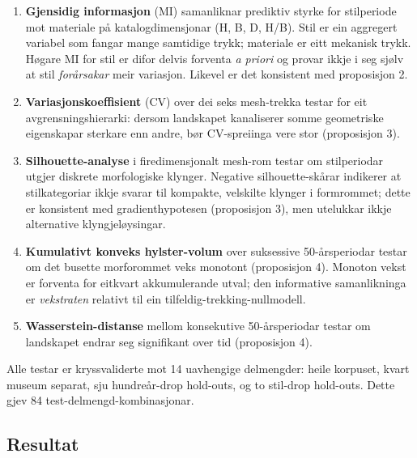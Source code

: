 \begin{enumerate}
\item \textbf{Gjensidig informasjon} (MI) samanliknar prediktiv styrke for stilperiode mot materiale på katalogdimensjonar (H, B, D, H/B). Stil er ein aggregert variabel som fangar mange samtidige trykk; materiale er eitt mekanisk trykk. Høgare MI for stil er difor delvis forventa \textit{a priori} og provar ikkje i seg sjølv at stil \textit{forårsakar} meir variasjon. Likevel er det konsistent med proposisjon 2.

\item \textbf{Variasjonskoeffisient} (CV) over dei seks mesh-trekka testar for eit avgrensningshierarki: dersom landskapet kanaliserer somme geometriske eigenskapar sterkare enn andre, bør CV-spreiinga vere stor (proposisjon 3).

\item \textbf{Silhouette-analyse} i firedimensjonalt mesh-rom testar om stilperiodar utgjer diskrete morfologiske klynger. Negative silhouette-skårar indikerer at stilkategoriar ikkje svarar til kompakte, velskilte klynger i formrommet; dette er konsistent med gradienthypotesen (proposisjon 3), men utelukkar ikkje alternative klyngjeløysingar.

\item \textbf{Kumulativt konveks hylster-volum} over suksessive 50-årsperiodar testar om det busette morforommet veks monotont (proposisjon 4). Monoton vekst er forventa for eitkvart akkumulerande utval; den informative samanlikninga er \textit{vekstraten} relativt til ein tilfeldig-trekking-nullmodell.

\item \textbf{Wasserstein-distanse} mellom konsekutive 50-årsperiodar testar om landskapet endrar seg signifikant over tid (proposisjon 4).
\end{enumerate}

Alle testar er kryssvaliderte mot 14 uavhengige delmengder: heile korpuset, kvart museum separat, sju hundreår-drop hold-outs, og to stil-drop hold-outs. Dette gjev 84 test-delmengd-kombinasjonar.

\subsection{Resultat}

